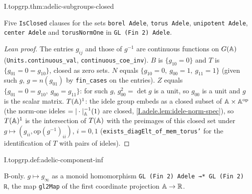 \begin{theorem}
\end{theorem}
\begin{tfformal}{I.topgrp.thm:adelic-subgroups-closed}
\begin{tffidelity}
Five \texttt{IsClosed} clauses for the sets \texttt{borel Adele}, \texttt{torus Adele}, \texttt{unipotent Adele}, \texttt{center Adele} and \texttt{torusNormOne} in \texttt{GL (Fin 2) Adele}.
\end{tffidelity}
\end{tfformal}
\begin{proof}[Lean proof]
The entries $g_{ij}$ and those of $g^{-1}$ are continuous functions on $G(\mathbb{A})$ (\texttt{Units.continuous\_val}, \texttt{continuous\_coe\_inv}). $B$ is $\{g_{10}=0\}$ and $T$ is $\{g_{01}=0=g_{10}\}$, closed as zero sets. $N$ equals $\{g_{10}=0,\ g_{00}=1,\ g_{11}=1\}$ (given such $g$, $g=n(g_{01})$ by \texttt{fin\_cases} on the entries). $Z$ equals $\{g_{01}=0=g_{10},\ g_{00}=g_{11}\}$: for such $g$, $g_{00}^2=\det g$ is a unit, so $g_{00}$ is a unit and $g$ is the scalar matrix. $T(\mathbb{A})^1$: the idele group embeds as a closed subset of $\mathbb{A}\times\mathbb{A}^{\mathrm{op}}$ (the norm-one ideles $=|\cdot|_{\mathbb{A}}^{-1}(1)$ are closed, \cref{I.adele.lem:idele-norm-spec}), so $T(\mathbb{A})^1$ is the intersection of $T(\mathbb{A})$ with the preimages of this closed set under $g\mapsto(g_{ii},\mathrm{op}(g^{-1})_{ii})$, $i=0,1$ (\texttt{exists\_diagElt\_of\_mem\_torus'} for the identification of $T$ with pairs of ideles).
\end{proof}

\begin{definition}
\bonly
{}
\end{definition}
\begin{tfformal}{I.topgrp.def:adelic-component-inf}
\begin{tffidelity}
B-only. $g\mapsto g_\infty$ as a monoid homomorphism \texttt{GL (Fin 2) Adele →* GL (Fin 2) ℝ}, the map \texttt{gl2Map} of the first coordinate projection $\mathbb{A}\to\mathbb{R}$.
\end{tffidelity}
\end{tfformal}

